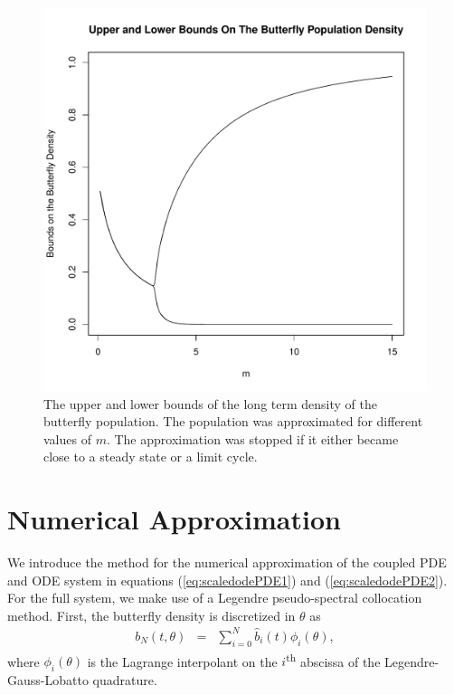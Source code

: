 \documentclass[12pt]{article}
\begin{document}
\begin{figure}[htb]
  \centering
  \includegraphics[width=12cm]{ODEButterflyBounds.pdf}
  \caption[Upper and lower bounds of the butterfly density.]{The upper
    and lower bounds of the long term density of the butterfly
    population. The population was approximated for different values
    of $m$. The approximation was stopped if it either became close to
    a steady state or a limit cycle.}
  \label{fig:odeButterflyBifurcation}
\end{figure}

\section{Numerical Approximation}

We introduce the method for the numerical approximation of the coupled
PDE and ODE system in equations (\ref{eq:scaledodePDE1}) and
(\ref{eq:scaledodePDE2}). For the full system, we make use of a
Legendre pseudo-spectral collocation
method\cite{spectralMethodsFluids,hesthaven_gottlieb_gottlieb_2007,gottlieb1977numerical}. First,
the butterfly density is discretized in $\theta$ as
\begin{eqnarray}
  \label{eqn:spatialDiscretization}
  b_N(t,\theta) & = & \sum^N_{i=0} \hat{b}_i(t) \phi_i(\theta),
\end{eqnarray}
where $\phi_i(\theta)$ is the Lagrange interpolant on the
$i$\textsuperscript{th} abscissa of the Legendre-Gauss-Lobatto
quadrature\cite{hesthaven_gottlieb_gottlieb_2007}.
\end{document}
